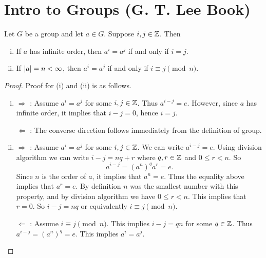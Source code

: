 \chapter{Intro to Groups (G. T. Lee Book)}


\begin{theorem}
	Let $ G $ be a group and let $ a \in G $. Suppose $ i,j \in \mathbb{Z} $. Then
	\begin{enumerate}[(i)]
		\item If $ a $ has infinite order, then $ a^i = a^j $ if and only if $ i = j $.
		\item If $ |a| = n < \infty $, then $ a^i = a^j $ if and only if $ i\equiv j \pmod n $.  
	\end{enumerate}
\end{theorem}
\begin{proof}
	Proof for (i) and (ii) is as follows.
	\begin{enumerate}[(i)]
		\item $ \boxed{\Rightarrow} $ : Assume $ a^i = a^j $ for some $ i,j \in \mathbb{Z} $. Thus $ a^{i-j} = e $. However, since $ a $ has infinite order, it implies that $ i-j = 0 $, hence $ i=j $.
		
		\noindent $\boxed{\Leftarrow} $ : The converse direction follows immediately from the definition of group.
		
		
		\item $ \boxed{\Rightarrow} $ : Assume $ a^i = a^j $ for some $ i,j\in \mathbb{Z} $. We can write $ a^{i-j} = e $. Using division algorithm we can write $ i-j = nq + r $ where $ q,r \in \mathbb{Z} $ and $ 0 \leq r < n $. So
		\[ a^{i-j} = (a^n)^q a^r = e. \]
		Since $ n $ is the order of $ a $, it implies that $ a^n = e $. Thus the equality above implies that $ a^r = e $. By definition $ n $ was the smallest number with this property, and by division algorithm we have $ 0 \leq r < n $. This implies that $ r = 0 $. So $ i-j = nq $ or equivalently $ i \equiv j \pmod n $.
		
		\noindent $ \boxed{\Leftarrow} $ : Assume $ i\equiv j \pmod n $. This implies $ i-j = qn $ for some $ q\in \mathbb{Z} $. Thus $ a^{i-j} = (a^n)^q = e $. This implies $ a^{i} = a^j $.
		
	\end{enumerate}
\end{proof}



